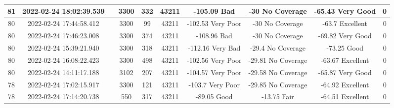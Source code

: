\begin{longtable*}{|c|c|c|c|c|c|c|c|c|c|}
81&2022-02-24 18:02:39.539&&3300&332&43211& -105.09   Bad         & -30       No Coverage & -65.43    Very Good   & 0\\\hline
{}80&2022-02-24 17:44:58.412&&3300&99&43211& -102.53   Very Poor   & -30       No Coverage & -63.7     Excellent   & 0\\\hline
{}80&2022-02-24 17:46:23.008&&3300&374&43211& -108.96   Bad         & -30       No Coverage & -69.82    Very Good   & 0\\\hline
{}80&2022-02-24 15:39:21.940&&3300&318&43211& -112.16   Very Bad    & -29.4     No Coverage & -73.25    Good        & 0\\\hline
{}80&2022-02-24 16:08:22.423&&3300&498&43211& -102.56   Very Poor   & -29.81    No Coverage & -63.67    Excellent   & 0\\\hline
{}80&2022-02-24 14:11:17.188&&3102&207&43211& -104.57   Very Poor   & -29.58    No Coverage & -65.87    Very Good   & 0\\\hline
{}78&2022-02-24 17:02:15.917&&3300&121&43211& -103.7    Very Poor   & -29.85    No Coverage & -64.92    Excellent   & 0\\\hline
{}78&2022-02-24 17:14:20.738&&550&317&43211& -89.05    Good        & -13.75    Fair        & -64.51    Excellent   & 0\\\hline

\end{longtable*}
